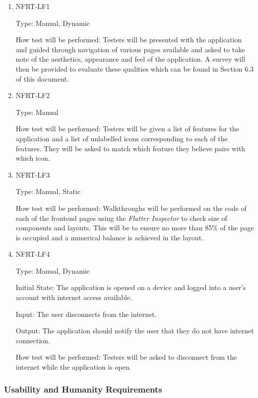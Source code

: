 \documentclass[12pt, titlepage]{article}
\begin{document}
\begin{enumerate}
  \item{NFRT-LF1\\}

  Type: Manual, Dynamic
            
  How test will be performed: Testers will be presented with the application and guided through navigation of various
  pages available and asked to take note of the aesthetics, appearance and feel of the application. A survey
  will then be provided to evaluate these qualities which can be found in Section 6.3 of this document.
            
  \item{NFRT-LF2\\}

  Type: Manual
            
  How test will be performed: Testers will be given a list of features for the application and a list of
  unlabelled icons corresponding to each of the features. They will be asked to match which feature
  they believe pairs with which icon.

  \item{NFRT-LF3\\}

  Type: Manual, Static

  How test will be performed: Walkthroughs will be performed on the code of each of the frontend pages
  using the \textit{Flutter Inspector} to check size of components and layouts. This will be to ensure no more than
  85\% of the page is occupied and a numerical balance is achieved in the layout.

  \item{NFRT-LF4\\}

  Type: Manual, Dynamic

  Initial State: The application is opened on a device and logged into a user's account with internet access available.

  Input: The user disconnects from the internet.

  Output: The application should notify the user that they do not have internet connection.

  How test will be performed: Testers will be asked to disconnect from the internet while the application is open.
\end{enumerate}

\subsubsection{Usability and Humanity Requirements}
\end{document}
